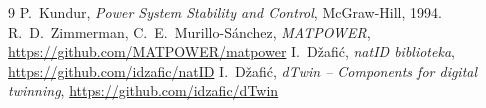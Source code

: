 \documentclass[12pt,oneside, a4paper]{book}
\begin{document}
\begin{thebibliography}{9}
 P.~Kundur, \emph{Power System Stability and Control},
McGraw-Hill, 1994.
 R.~D.~Zimmerman, C.~E.~Murillo-S\'anchez,
\emph{MATPOWER}, \url{https://github.com/MATPOWER/matpower}
 I.~Džafić, \emph{natID biblioteka},
\url{https://github.com/idzafic/natID}
 I.~Džafić, \emph{dTwin -- Components for digital twinning},
\url{https://github.com/idzafic/dTwin}
\end{thebibliography}
 
\end{document}
